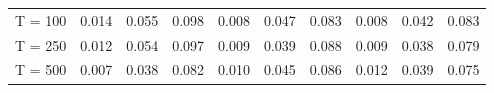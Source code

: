 % 
\begin{tabular}{cccccccccc}
  \hline
  \hline
T = 100 & 0.014 & 0.055 & 0.098 & 0.008 & 0.047 & 0.083 & 0.008 & 0.042 & 0.083 \\ 
  T = 250 & 0.012 & 0.054 & 0.097 & 0.009 & 0.039 & 0.088 & 0.009 & 0.038 & 0.079 \\ 
  T = 500 & 0.007 & 0.038 & 0.082 & 0.010 & 0.045 & 0.086 & 0.012 & 0.039 & 0.075 \\ 
   \hline
\end{tabular}
